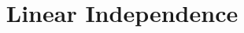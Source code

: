 \documentclass{ximera}
\title[Dig-In:]{Linear Independence}
\begin{document}
\begin{abstract}
  
\end{abstract}
\maketitle
\end{document}
